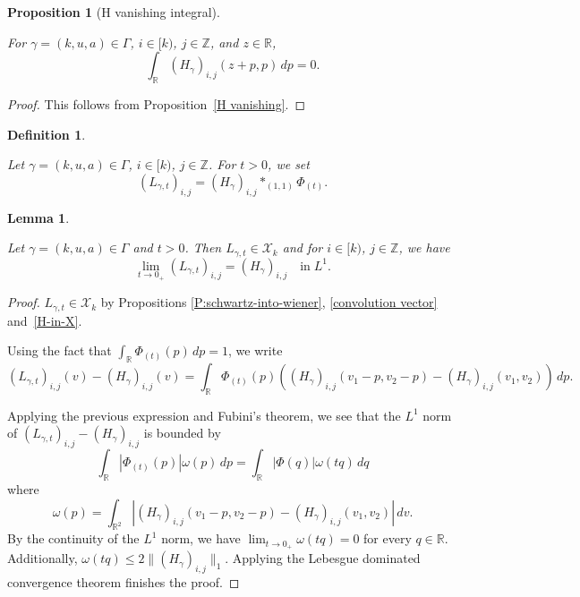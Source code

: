 \documentclass[12pt,reqno]{amsart}
\theoremstyle{plain}
\newtheorem{lemma}[theorem]{Lemma}
\newtheorem{proposition}[theorem]{Proposition}
\newtheorem{definition}[theorem]{Definition}
\numberwithin{equation}{section}
\theoremstyle{remark}
\newcommand{\uses}[1]{}
\newcommand{\usesdefs}[1]{}
\newcommand{\leanok}{}
\newcommand{\lean}[1]{}
\newcommand{\Z}{{\mathbb Z}}
\newcommand{\R}{{\mathbb R}}
\begin{document}
\begin{proposition}[H vanishing integral]\label{H vanishing integral}\uses{H vanishing}\usesdefs{geometric parameters,H multiplier}
\lean{Auto.hMultiplier_vanishing_integral}
\leanok
    For $\gamma=(k,u,a)\in \Gamma$, $i\in [k)$, $j\in \Z$, and $z\in \R$,
\begin{equation}\label{auto:H-kernel-diagonal-cancellation-integral}
   \int_{\R} (H_{\gamma})_{i,j}(z+p,p)\,dp=0.
\end{equation}
\end{proposition}

\begin{proof}
This follows from Proposition~\ref{H vanishing}.
\end{proof}


\begin{definition}\label{auto:L-kernel-definition}\uses{}\usesdefs{auto:convolution-along-vector-definition,standard bump,geometric parameters,H multiplier}
\lean{Auto.lMultiplierAtScale}
Let $\gamma=(k,u,a)\in \Gamma$, $i\in [k)$, $j\in \Z$. For $t>0$, we set
\begin{equation}\label{auto:L-kernel-convolution}
(L_{\gamma,t})_{i,j} =(H_{\gamma})_{i,j} \ast_{(1,1)} \Phi_{(t)}.
\end{equation}
\end{definition}

\begin{lemma}\label{L:F_t}
\lean{Auto.lMultiplierAtScale_memDoubleSequence,Auto.lMultiplierAtScale_tendsto_hMultiplier}
\leanok
\uses{P:schwartz-into-wiener,convolution vector,H-in-X}\usesdefs{standard bump,geometric parameters,double sequence of 2D functions,H multiplier,auto:L-kernel-definition}
Let $\gamma=(k,u,a)\in \Gamma$ and $t>0$. Then $L_{\gamma,t} \in \mathcal{X}_k$ and for $i\in [k)$, $j\in \Z$, we have
\begin{equation}\label{auto:L-kernel-small-scale-limit}
\lim_{t\to 0_+} (L_{\gamma,t})_{i,j} = (H_{\gamma})_{i,j} \quad\text{in}\;L^1.
\end{equation}
\end{lemma}

\begin{proof}
$L_{\gamma,t} \in \mathcal{X}_k$ by Propositions \ref{P:schwartz-into-wiener}, \ref{convolution vector}  and~\ref{H-in-X}.

Using the fact that $\int_{\R} \Phi_{(t)}(p)\,dp=1$, we write
\[
(L_{\gamma,t})_{i,j}(v)-(H_{\gamma})_{i,j}(v)
=\int_{\R} \Phi_{(t)}(p) ((H_\gamma)_{i,j}(v_1-p,v_2-p)-(H_\gamma)_{i,j}(v_1,v_2))\,dp.
\]

Applying the previous expression and Fubini's theorem, we see that the $L^1$ norm of $(L_{\gamma,t})_{i,j}-(H_{\gamma})_{i,j}$ is bounded by
\[
\int_{\R} |\Phi_{(t)}(p)| \omega(p)\,dp
=\int_{\R} |\Phi(q)| \omega(tq)\,dq
\]
where
\[
\omega(p)=\int_{\R^2} |(H_\gamma)_{i,j}(v_1-p,v_2-p)-(H_\gamma)_{i,j}(v_1,v_2)|\,dv.
\]
By the continuity of the $L^1$ norm, we have $\lim_{t\to 0_+} \omega(tq)=0$ for every $q\in \R$. Additionally, $\omega(tq) \leq 2\|(H_{\gamma})_{i,j}\|_1$. Applying the Lebesgue dominated convergence theorem finishes the proof.
\end{proof}
\end{document}
